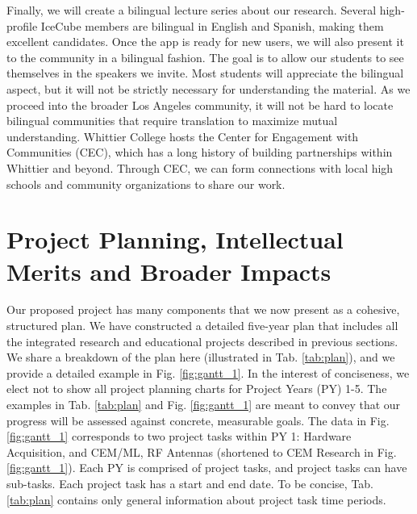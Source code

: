 \documentclass[11pt]{amsart}
\begin{document}
Finally, we will create a bilingual lecture series about our research.  Several high-profile IceCube members are bilingual in English and Spanish, making them excellent candidates.  Once the app is ready for new users, we will also present it to the community in a bilingual fashion.  The goal is to allow our students to see themselves in the speakers we invite.  Most students will appreciate the bilingual aspect, but it will not be strictly necessary for understanding the material.  As we proceed into the broader Los Angeles community, it will not be hard to locate bilingual communities that require translation to maximize mutual understanding.  Whittier College hosts the Center for Engagement with Communities (CEC), which has a long history of building partnerships within Whittier and beyond.  Through CEC, we can form connections with local high schools and community organizations to share our work.

\section{Project Planning, Intellectual Merits and Broader Impacts}
\label{sec:time_im}

Our proposed project has many components that we now present as a cohesive, structured plan.  We have constructed a detailed five-year plan that includes all the integrated research and educational projects described in previous sections.  We share a breakdown of the plan here (illustrated in Tab. \ref{tab:plan}), and we provide a detailed example in Fig. \ref{fig:gantt_1}.  In the interest of conciseness, we elect not to show all project planning charts for Project Years (PY) 1-5.  The examples in Tab. \ref{tab:plan} and Fig. \ref{fig:gantt_1} are meant to convey that our progress will be assessed against concrete, measurable goals.  The data in Fig. \ref{fig:gantt_1} corresponds to two project tasks within PY 1: Hardware Acquisition, and CEM/ML, RF Antennas (shortened to CEM Research in Fig. \ref{fig:gantt_1}).  Each PY is comprised of project tasks, and project tasks can have sub-tasks.  Each project task has a start and end date.  To be concise, Tab. \ref{tab:plan} contains only general information about project task time periods.
\end{document}
